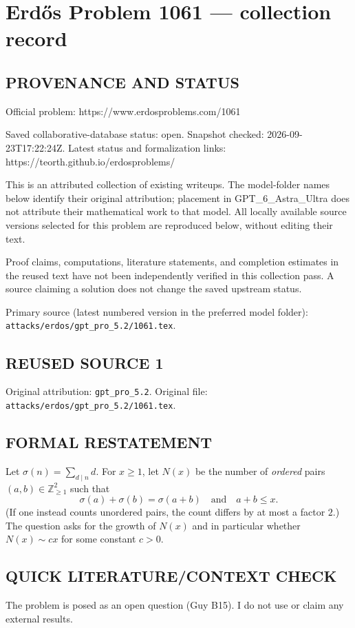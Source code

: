 \section*{Erd\H{o}s Problem 1061 --- collection record}

\subsection*{PROVENANCE AND STATUS}
Official problem: https://www.erdosproblems.com/1061

Saved collaborative-database status: open.
Snapshot checked: 2026-09-23T17:22:24Z.
Latest status and formalization links: https://teorth.github.io/erdosproblems/

This is an attributed collection of existing writeups. The model-folder names below identify their original attribution; placement in GPT\_6\_Astra\_Ultra does not attribute their mathematical work to that model. All locally available source versions selected for this problem are reproduced below, without editing their text.

Proof claims, computations, literature statements, and completion estimates in the reused text have not been independently verified in this collection pass. A source claiming a solution does not change the saved upstream status.

Primary source (latest numbered version in the preferred model folder): \texttt{attacks/erdos/gpt\_pro\_5.2/1061.tex}.

\subsection*{REUSED SOURCE 1}
Original attribution: \texttt{gpt\_pro\_5.2}.
Original file: \texttt{attacks/erdos/gpt\_pro\_5.2/1061.tex}.


\subsection*{FORMAL RESTATEMENT}
Let $\sigma(n)=\sum_{d\mid n} d$. For $x\ge 1$, let $N(x)$ be the number of \emph{ordered} pairs $(a,b)\in\mathbb Z_{\ge 1}^2$ such that
\[
\sigma(a)+\sigma(b)=\sigma(a+b)\quad\text{and}\quad a+b\le x.
\]
(If one instead counts unordered pairs, the count differs by at most a factor $2$.)
The question asks for the growth of $N(x)$ and in particular whether $N(x)\sim c x$ for some constant $c>0$.

\subsection*{QUICK LITERATURE/CONTEXT CHECK}
The problem is posed as an open question (Guy B15). I do not use or claim any external results.

